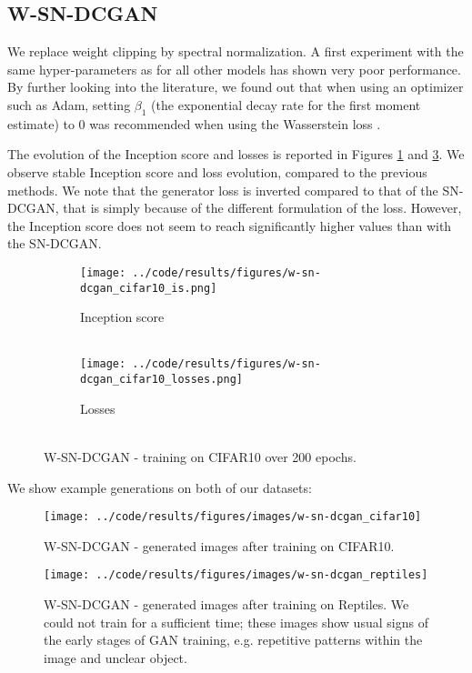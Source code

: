 \subsection{W-SN-DCGAN}
\label{sec:exp-wsndcgan}
We replace weight clipping by spectral normalization. A first experiment with the same hyper-parameters as for all other models has shown very poor performance. By further looking into the literature, we found out that when using an optimizer such as Adam, setting $\beta_1$ (the exponential decay rate for the first moment estimate) to 0 was recommended when using the Wasserstein loss \cite{arjovsky2017wasserstein}.

The evolution of the Inception score and losses is reported in Figures \ref{fig:exp-w-sn-dcgan-is} and \ref{fig:exp-w-sn-dcgan-losses}. We observe stable Inception score and loss evolution, compared to the previous methods. We note that the generator loss is inverted compared to that of the SN-DCGAN, that is simply because of the different formulation of the loss. However, the Inception score does not seem to reach significantly higher values than with the SN-DCGAN.

\begin{figure}[H]
    \centering
    \begin{subfigure}[t]{0.49\textwidth}
        \centering
		\texttt{[image: ../code/results/figures/w-sn-dcgan\_cifar10\_is.png]}
		\caption{Inception score\\~}
		\label{fig:exp-w-sn-dcgan-is}
    \end{subfigure}
    \begin{subfigure}[t]{0.49\textwidth}
        \centering
        \texttt{[image: ../code/results/figures/w-sn-dcgan\_cifar10\_losses.png]}
		\caption{Losses\\~}
		\label{fig:exp-w-sn-dcgan-losses}
    \end{subfigure}
    \caption{W-SN-DCGAN - training on CIFAR10 over 200 epochs.}
\end{figure}

We show example generations on both of our datasets:
\begin{figure}[H]
\centering
\texttt{[image: ../code/results/figures/images/w-sn-dcgan\_cifar10]}
\caption{W-SN-DCGAN - generated images after training on CIFAR10.}
\end{figure}

\begin{figure}[H]
\centering
\texttt{[image: ../code/results/figures/images/w-sn-dcgan\_reptiles]}
\caption{W-SN-DCGAN - generated images after training on Reptiles. We could not train for a sufficient time; these images show usual signs of the early stages of GAN training, e.g. repetitive patterns within the image and unclear object.}
\end{figure}